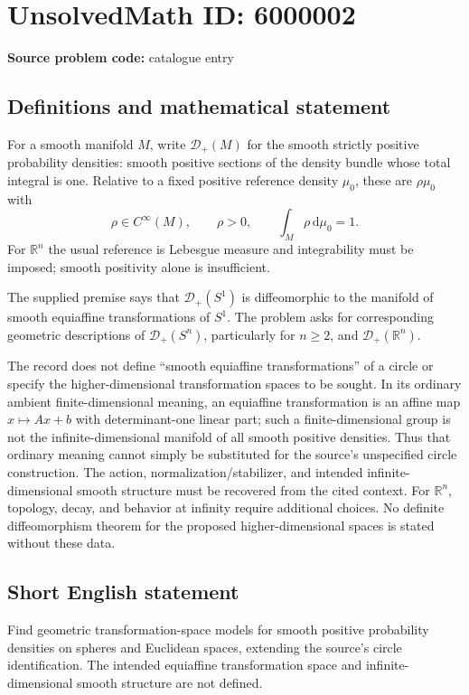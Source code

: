 \documentclass[11pt]{article}
\newcommand{\R}{\mathbb{R}}
\begin{document}
\section*{UnsolvedMath ID: 6000002}
\textbf{Source problem code:} catalogue entry
\subsection{Definitions and mathematical statement}
For a smooth manifold $M$, write $\mathcal D_+(M)$ for the smooth strictly positive probability densities: smooth positive sections of the density bundle whose total integral is one. Relative to a fixed positive reference density $\mu_0$, these are $\rho\mu_0$ with
\[
\rho\in C^\infty(M),\qquad \rho>0,\qquad \int_M\rho\,\mathrm d\mu_0=1.
\]
For $\R^n$ the usual reference is Lebesgue measure and integrability must be imposed; smooth positivity alone is insufficient.

The supplied premise says that $\mathcal D_+(S^1)$ is diffeomorphic to the manifold of smooth equiaffine transformations of $S^1$. The problem asks for corresponding geometric descriptions of $\mathcal D_+(S^n)$, particularly for $n\geq2$, and $\mathcal D_+(\R^n)$.

The record does not define ``smooth equiaffine transformations'' of a circle or specify the higher-dimensional transformation spaces to be sought. In its ordinary ambient finite-dimensional meaning, an equiaffine transformation is an affine map $x\mapsto Ax+b$ with determinant-one linear part; such a finite-dimensional group is not the infinite-dimensional manifold of all smooth positive densities. Thus that ordinary meaning cannot simply be substituted for the source's unspecified circle construction. The action, normalization/stabilizer, and intended infinite-dimensional smooth structure must be recovered from the cited context. For $\R^n$, topology, decay, and behavior at infinity require additional choices. No definite diffeomorphism theorem for the proposed higher-dimensional spaces is stated without these data.
\subsection{Short English statement}
Find geometric transformation-space models for smooth positive probability densities on spheres and Euclidean spaces, extending the source's circle identification. The intended equiaffine transformation space and infinite-dimensional smooth structure are not defined.
\end{document}
